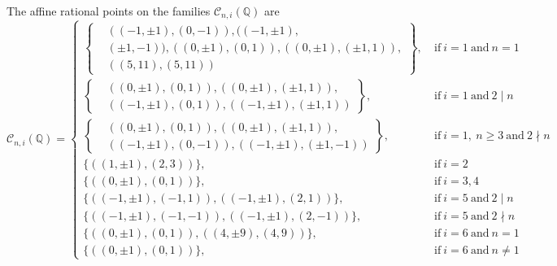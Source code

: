 \documentclass[12pt]{beamer}
\begin{document}
\begin{frame}

\begin{alertblock}{The affine rational points on the families   $\mathcal{C}_{n,i}(\mathbb{Q}) $ are}
	\[
		\mathcal{C}_{n,i}(\mathbb{Q}) = \begin{cases}
			\left\{ \begin{aligned}
				&((-1,\pm 1),(0,-1)),((-1,\pm 1),\\ &(\pm 1,-1)),((0,\pm 1),(0,1)), ((0,\pm 1),(\pm 1,1)),\\ &((5,11),(5,11))
			\end{aligned}\right\}, \ &\text{if} \ i = 1 \ \text{and} \ n = 1 \\
			\left\{\begin{aligned}
				&((0,\pm 1),(0,1)),((0,\pm 1),(\pm 1,1)),\\ &((-1,\pm 1),(0,1)),((-1,\pm 1),(\pm 1,1))
			\end{aligned}\right\}, \ &\text{if} \ i = 1 \ \text{and} \ 2 \mid n \\
			\left\{\begin{aligned}
				&((0,\pm 1),(0,1)),((0,\pm 1),(\pm 1,1)), \\ &((-1,\pm 1),(0,-1)),((-1,\pm 1),(\pm 1,-1))
			\end{aligned}\right\}, \ &\text{if} \ i = 1, \ n \geq 3 \ \text{and} \ 2 \nmid n \\
			\{((1,\pm 1),(2,3))\}, \ &\text{if} \ i = 2 \\
			\{((0,\pm 1),(0,1))\}, \ &\text{if} \ i = 3, 4 \\
			\{((-1,\pm 1),(-1,1)),((-1,\pm 1),(2,1))\}, \ &\text{if} \ i = 5 \ \text{and} \ 2 \mid n \\
			\{((-1,\pm 1),(-1,-1)),((-1,\pm 1),(2,-1))\}, \ &\text{if} \ i = 5 \ \text{and} \ 2 \nmid n \\
			\{((0,\pm 1),(0,1)),((4,\pm 9),(4,9))\}, &\text{if} \ i = 6 \ \text{and} \ n = 1 \\
			\{((0,\pm 1),(0,1))\}, &\text{if} \ i = 6 \ \text{and} \ n \neq 1
		\end{cases}
	\]\end{alertblock}

\end{frame}
\end{document}

